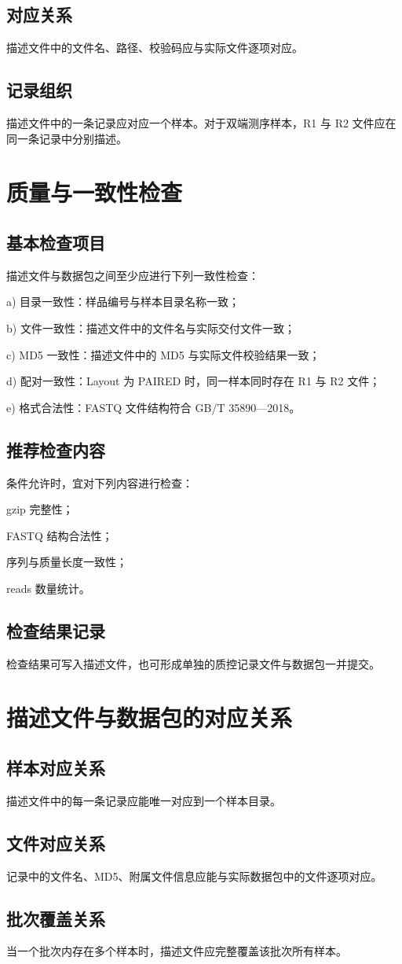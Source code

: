 \section{对应关系}
描述文件中的文件名、路径、校验码应与实际文件逐项对应。

\section{记录组织}
描述文件中的一条记录应对应一个样本。对于双端测序样本，R1 与 R2 文件应在同一条记录中分别描述。

\chapter{质量与一致性检查}
\section{基本检查项目}
描述文件与数据包之间至少应进行下列一致性检查：

a) 目录一致性：样品编号与样本目录名称一致；

b) 文件一致性：描述文件中的文件名与实际交付文件一致；

c) MD5 一致性：描述文件中的 MD5 与实际文件校验结果一致；

d) 配对一致性：Layout 为 PAIRED 时，同一样本同时存在 R1 与 R2 文件；

e) 格式合法性：FASTQ 文件结构符合 GB/T 35890—2018。

\section{推荐检查内容}
条件允许时，宜对下列内容进行检查：

gzip 完整性；

FASTQ 结构合法性；

序列与质量长度一致性；

reads 数量统计。

\section{检查结果记录}
检查结果可写入描述文件，也可形成单独的质控记录文件与数据包一并提交。

\chapter{描述文件与数据包的对应关系}
\section{样本对应关系}
描述文件中的每一条记录应能唯一对应到一个样本目录。

\section{文件对应关系}
记录中的文件名、MD5、附属文件信息应能与实际数据包中的文件逐项对应。

\section{批次覆盖关系}
当一个批次内存在多个样本时，描述文件应完整覆盖该批次所有样本。
